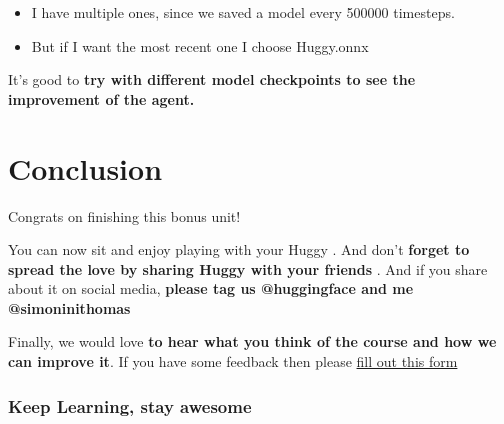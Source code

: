\documentclass[11pt,a4paper]{article}
\begin{document}
\begin{itemize}
\tightlist
\item
  I have multiple ones, since we saved a model every 500000 timesteps.
\item
  But if I want the most recent one I choose Huggy.onnx
\end{itemize}

It's good to \textbf{try with different model checkpoints to see the improvement of the agent.}

\section{Conclusion}\label{conclusion}

Congrats on finishing this bonus unit!

You can now sit and enjoy playing with your Huggy . And don't \textbf{forget to spread the love by sharing Huggy with your friends }. And if you share about it on social media, \textbf{please tag us @huggingface and me @simoninithomas}


Finally, we would love \textbf{to hear what you think of the course and how we can improve it}. If you have some feedback then please \href{https://forms.gle/BzKXWzLAGZESGNaE9}{fill out this form}

\subsubsection{Keep Learning, stay awesome}\label{keep-learning-stay-awesome-1}
\end{document}
